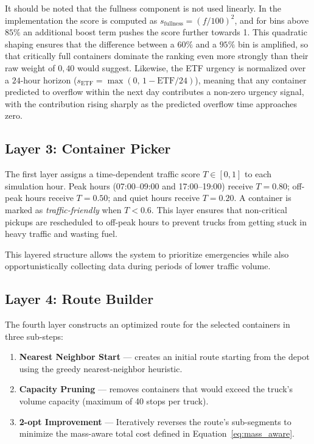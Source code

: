 \documentclass[12pt,a4paper]{report}
\begin{document}
\indent It should be noted that the fullness component is not used linearly.
In the implementation the score is computed as $s_{\text{fullness}} =
(f/100)^2$, and for bins above $85\%$ an additional boost term pushes the score
further towards 1. This quadratic shaping ensures that the difference between a
$60\%$ and a $95\%$ bin is amplified, so that critically full containers
dominate the ranking even more strongly than their raw weight of $0{,}40$ would
suggest. Likewise, the ETF urgency is normalized over a $24$-hour horizon
($s_{\text{ETF}} = \max(0,\,1 - \text{ETF}/24)$), meaning that any container
predicted to overflow within the next day contributes a non-zero urgency
signal, with the contribution rising sharply as the predicted overflow time
approaches zero.

\subsection{Layer 3: Container Picker}

The first layer assigns a time-dependent traffic score $T \in [0, 1]$ to each simulation hour. Peak hours (07:00--09:00 and 17:00--19:00) receive $T = 0.80$; off-peak hours receive $T = 0.50$; and quiet hours receive $T = 0.20$. A container is marked as \textit{traffic-friendly} when $T < 0.6$. This layer ensures that non-critical pickups are rescheduled to off-peak hours to prevent trucks from getting stuck in heavy traffic and wasting fuel.

\indent This layered structure allows the system to prioritize emergencies while also opportunistically collecting data during periods of lower traffic volume.

\subsection{Layer 4: Route Builder}

\indent The fourth layer constructs an optimized route for the selected containers in three sub-steps:
\begin{enumerate}[leftmargin=2cm]
  \item \textbf{Nearest Neighbor Start} --- creates an initial route starting from the depot using the greedy nearest-neighbor heuristic.
  \item \textbf{Capacity Pruning} --- removes containers that would exceed the truck’s volume capacity (maximum of 40 stops per truck).
  \item \textbf{2-opt Improvement} --- Iteratively reverses the route’s sub-segments to minimize the mass-aware total cost defined in Equation~\ref{eq:mass_aware}.
\end{enumerate}
\end{document}

